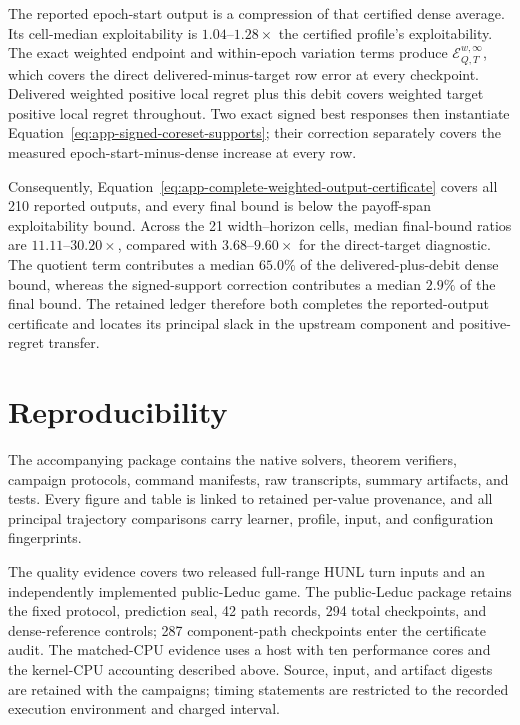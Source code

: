 The reported epoch-start output is a compression of that certified dense
average.  Its cell-median exploitability is $1.04$--$1.28\times$ the certified
profile's exploitability.  The exact weighted endpoint and within-epoch
variation terms produce $\mathcal E_{Q,T}^{w,\infty}$, which covers the direct
delivered-minus-target row error at every checkpoint.  Delivered weighted
positive local regret plus this debit covers weighted target positive local
regret throughout.  Two exact signed best responses then instantiate
Equation~\ref{eq:app-signed-coreset-supports}; their correction separately
covers the measured epoch-start-minus-dense increase at every row.

Consequently, Equation~\ref{eq:app-complete-weighted-output-certificate}
covers all 210 reported outputs, and every final bound is below the
payoff-span exploitability bound.  Across the 21 width--horizon cells, median
final-bound ratios are $11.11$--$30.20\times$, compared with
$3.68$--$9.60\times$ for the direct-target diagnostic.  The quotient term
contributes a median $65.0\%$ of the delivered-plus-debit dense bound, whereas
the signed-support correction contributes a median $2.9\%$ of the final
bound.  The retained ledger therefore both completes the reported-output
certificate and locates its principal slack in the upstream component and
positive-regret transfer.

\section{Reproducibility}
\label{app:repro}

The accompanying package contains the native solvers, theorem verifiers,
campaign protocols, command manifests, raw transcripts, summary artifacts,
and tests.  Every figure and table is linked to retained per-value provenance,
and all principal trajectory comparisons carry learner, profile, input, and
configuration fingerprints.

The quality evidence covers two released full-range HUNL turn inputs and an
independently implemented public-Leduc game.  The public-Leduc package retains
the fixed protocol, prediction seal, 42 path records, 294 total checkpoints,
and dense-reference controls; 287 component-path checkpoints
enter the certificate audit.  The matched-CPU evidence uses a host with ten
performance cores and the kernel-CPU accounting described above.  Source,
input, and artifact digests are retained with the campaigns; timing statements
are restricted to the recorded execution environment and charged interval.
